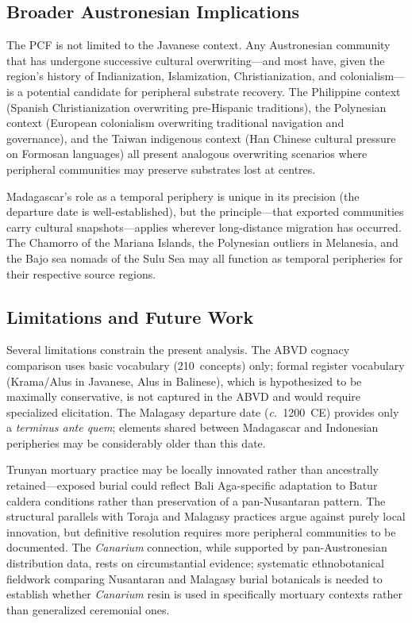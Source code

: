 \documentclass[12pt,a4paper]{article}
\begin{document}
\subsection{Broader Austronesian Implications}

The PCF is not limited to the Javanese context. Any Austronesian community that has undergone successive cultural overwriting---and most have, given the region's history of Indianization, Islamization, Christianization, and colonialism---is a potential candidate for peripheral substrate recovery. The Philippine context (Spanish Christianization overwriting pre-Hispanic traditions), the Polynesian context (European colonialism overwriting traditional navigation and governance), and the Taiwan indigenous context (Han Chinese cultural pressure on Formosan languages) all present analogous overwriting scenarios where peripheral communities may preserve substrates lost at centres.

Madagascar's role as a temporal periphery is unique in its precision (the departure date is well-established), but the principle---that exported communities carry cultural snapshots---applies wherever long-distance migration has occurred. The Chamorro of the Mariana Islands, the Polynesian outliers in Melanesia, and the Bajo sea nomads of the Sulu Sea may all function as temporal peripheries for their respective source regions.

\subsection{Limitations and Future Work}

Several limitations constrain the present analysis. The ABVD cognacy comparison uses basic vocabulary (210~concepts) only; formal register vocabulary (Krama/Alus in Javanese, Alus in Balinese), which is hypothesized to be maximally conservative, is not captured in the ABVD and would require specialized elicitation. The Malagasy departure date (\textit{c.}~1200~CE) provides only a \emph{terminus ante quem}; elements shared between Madagascar and Indonesian peripheries may be considerably older than this date.

Trunyan mortuary practice may be locally innovated rather than ancestrally retained---exposed burial could reflect Bali Aga-specific adaptation to Batur caldera conditions rather than preservation of a pan-Nusantaran pattern. The structural parallels with Toraja and Malagasy practices argue against purely local innovation, but definitive resolution requires more peripheral communities to be documented. The \emph{Canarium} connection, while supported by pan-Austronesian distribution data, rests on circumstantial evidence; systematic ethnobotanical fieldwork comparing Nusantaran and Malagasy burial botanicals is needed to establish whether \emph{Canarium} resin is used in specifically mortuary contexts rather than generalized ceremonial ones.
\end{document}
